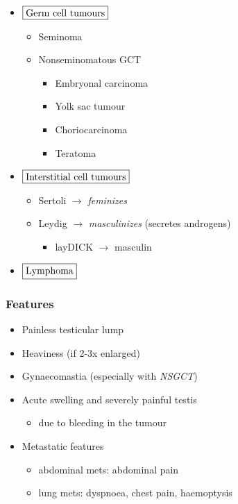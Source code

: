 \documentclass[
  14pt,
]{extarticle}
\providecommand{\tightlist}{%
  \setlength{\itemsep}{0pt}\setlength{\parskip}{0pt}}
\begin{document}
\begin{itemize}
\tightlist
\item
  \(\fbox{Germ cell tumours}\)

  \begin{itemize}
  \tightlist
  \item
    Seminoma
  \item
    Nonseminomatous GCT

    \begin{itemize}
    \tightlist
    \item
      Embryonal carcinoma
    \item
      Yolk sac tumour
    \item
      Choriocarcinoma
    \item
      Teratoma
    \end{itemize}
  \end{itemize}
\item
  \(\fbox{Interstitial cell tumours}\)

  \begin{itemize}
  \tightlist
  \item
    Sertoli \(\rightarrow\) \emph{feminizes}
  \item
    Leydig \(\rightarrow\) \emph{masculinizes} (secretes androgens)

    \begin{itemize}
    \tightlist
    \item
      layDICK \(\rightarrow\) masculin
    \end{itemize}
  \end{itemize}
\item
  \(\fbox{Lymphoma}\)
\end{itemize}

\hypertarget{features-8}{%
\subsubsection{Features}\label{features-8}}

\begin{itemize}
\tightlist
\item
  Painless testicular lump
\item
  Heaviness (if 2-3x enlarged)
\item
  Gynaecomastia (especially with \emph{NSGCT})
\item
  Acute swelling and severely painful testis

  \begin{itemize}
  \tightlist
  \item
    due to bleeding in the tumour
  \end{itemize}
\item
  Metastatic features

  \begin{itemize}
  \tightlist
  \item
    abdominal mets: abdominal pain
  \item
    lung mets: dyspnoea, chest pain, haemoptysis
  \end{itemize}
\end{itemize}
\end{document}
